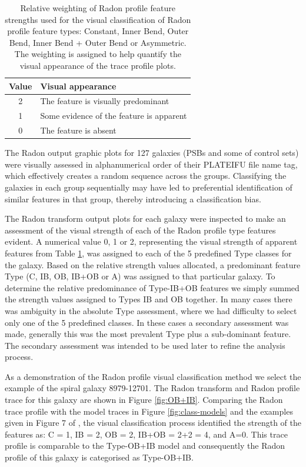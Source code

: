 \begin{table}
    \caption[Relative weighting of Radon profile feature strengths used in visual classification]{Relative weighting of Radon profile feature strengths used for the visual classification of Radon profile feature types: Constant, Inner Bend, Outer Bend, Inner Bend + Outer Bend or Asymmetric. The weighting is assigned to help quantify the visual appearance of the trace profile plots.}
    \label{tab:features}
    \centering
    \begin{tabular}{cl}
    \hline
    Value & Visual appearance \\
    \hline
    2 & The feature is visually predominant \\
    1 & Some evidence of the feature is apparent \\
    0 & The feature is absent \\
    \hline
    \end{tabular}
\end{table}

The Radon output graphic plots for 127 galaxies (PSBs and some of control sets) were visually assessed in alphanumerical order of their PLATEIFU file name tag, which effectively creates a random sequence across the groups. Classifying the galaxies in each group sequentially may have led to preferential identification of similar features in that group, thereby introducing a classification bias.

The Radon transform output plots for each galaxy were inspected to make an assessment of the visual strength of each of the Radon profile type features evident. A numerical value 0, 1 or 2, representing the visual strength of apparent features from Table \ref{tab:features}, was assigned to each of the 5 predefined Type classes for the galaxy. Based on the relative strength values allocated, a predominant feature Type (C, IB, OB, IB+OB or A) was assigned to that particular galaxy. To determine the relative predominance of Type-IB+OB features we simply summed the strength values assigned to Types IB and OB together. 
In many cases there was ambiguity in the absolute Type assessment, where we had difficulty to select only one of the 5 predefined classes. In these cases a secondary assessment was made, generally this was the most prevalent Type plus a sub-dominant feature. The secondary assessment was intended to be used later to refine the analysis process. 

As a demonstration of the Radon profile visual classification method we select the example of the spiral galaxy 8979-12701. The Radon transform and Radon profile trace for this galaxy are shown in Figure \ref{fig:OB+IB}. Comparing the Radon trace profile with the model traces in Figure \ref{fig:class-models} and the examples given in  Figure 7 of \cite{2018MNRAS.480.2217S}, the visual classification process identified the strength of the features as: C = 1, IB = 2, OB = 2, IB+OB = 2+2 = 4, and A=0. This trace profile is comparable to the Type-OB+IB model and consequently the Radon profile of this galaxy is categorised as Type-OB+IB.

